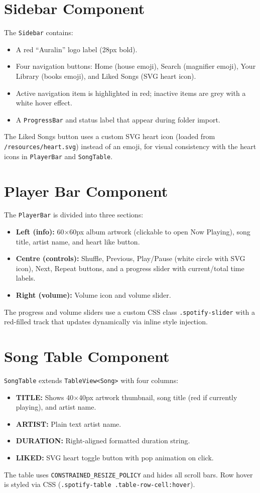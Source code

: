 ﻿\documentclass[12pt]{report}
\begin{document}
\section{Sidebar Component}
The \texttt{Sidebar} contains:
\begin{itemize}
    \item A red ``Auralin'' logo label (28px bold).
    \item Four navigation buttons: Home (house emoji), Search (magnifier emoji), Your Library (books emoji), and Liked Songs (SVG heart icon).
    \item Active navigation item is highlighted in red; inactive items are grey with a white hover effect.
    \item A \texttt{ProgressBar} and status label that appear during folder import.
\end{itemize}
The Liked Songs button uses a custom SVG heart icon (loaded from \texttt{/resources/heart.svg}) instead of an emoji, for visual consistency with the heart icons in \texttt{PlayerBar} and \texttt{SongTable}.

\section{Player Bar Component}
The \texttt{PlayerBar} is divided into three sections:
\begin{itemize}
    \item \textbf{Left (info):} 60$\times$60px album artwork (clickable to open Now Playing), song title, artist name, and heart like button.
    \item \textbf{Centre (controls):} Shuffle, Previous, Play/Pause (white circle with SVG icon), Next, Repeat buttons, and a progress slider with current/total time labels.
    \item \textbf{Right (volume):} Volume icon and volume slider.
\end{itemize}
The progress and volume sliders use a custom CSS class \texttt{.spotify-slider} with a red-filled track that updates dynamically via inline style injection.

\section{Song Table Component}
\texttt{SongTable} extends \texttt{TableView<Song>} with four columns:
\begin{itemize}
    \item \textbf{TITLE:} Shows 40$\times$40px artwork thumbnail, song title (red if currently playing), and artist name.
    \item \textbf{ARTIST:} Plain text artist name.
    \item \textbf{DURATION:} Right-aligned formatted duration string.
    \item \textbf{LIKED:} SVG heart toggle button with pop animation on click.
\end{itemize}
The table uses \texttt{CONSTRAINED\_RESIZE\_POLICY} and hides all scroll bars. Row hover is styled via CSS (\texttt{.spotify-table .table-row-cell:hover}).
\end{document}
